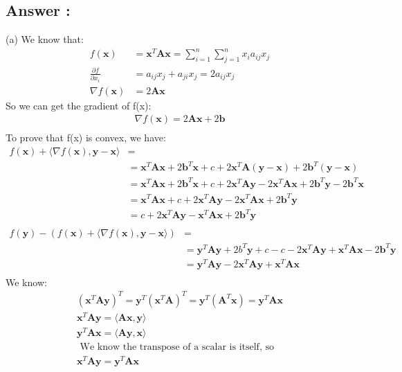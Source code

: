 \documentclass[a4paper,12pt]{article}
\begin{document}
\subsection*{Answer :}
(a) We know that:
\begin{align*}
    f(\bm{x}) &= \bm{x}^T\bm{A}\bm{x} = \sum_{i=1}^n \sum_{j = 1}^n x_i a_{ij} x_j \\
    \frac {\partial f}{\partial x_i} &= a_{ij}x_j + a_{ji}x_j = 2a_{ij}x_j \\
    \nabla f(\bm{x}) &= 2\bm{A}\bm{x}
\end{align*}
So we can get the gradient of f(x):
\begin{align*}
    \nabla f(\bm{x}) = 2\bm{A}\bm{x} + 2\bm{b} \\
\end{align*}
To prove that f(x) is convex, we have:
\begin{align*}
    f(\bm{x}) + \langle \nabla f(\bm{x}), \bm{y} - \bm{x}\rangle &=  \\
    &= \bm{x}^T\bm{A}\bm{x} + 2\bm{b}^T\bm{x} + c + 2\bm{x}^T\bm{A}(\bm{y} - \bm{x}) + 2\bm{b}^T(\bm{y} - \bm{x}) \\
    &= \bm{x}^T\bm{A}\bm{x} + 2\bm{b}^T\bm{x} + c + 2\bm{x}^T\bm{A}\bm{y} - 2\bm{x}^T\bm{A}\bm{x} + 2\bm{b}^T\bm{y} - 2\bm{b}^T\bm{x} \\
    &= \bm{x}^T\bm{A}\bm{x} + c + 2\bm{x}^T\bm{A}\bm{y} - 2\bm{x}^T\bm{A}\bm{x} + 2\bm{b}^T\bm{y} \\
    &= c + 2\bm{x}^T\bm{A}\bm{y} - \bm{x}^T\bm{A}\bm{x} + 2\bm{b}^T\bm{y} \\
\end{align*}
\begin{align*}
    f(\bm{y}) - (f(\bm{x} )+ \langle \nabla f(\bm{x}), \bm{y} - \bm{x}\rangle) &=  \\
    &= \bm{y}^T\bm{A}\bm{y} + 2b^T\bm{y} + c - c - 2\bm{x}^T\bm{A}\bm{y} + \bm{x}^T\bm{A}\bm{x} - 2\bm{b}^T\bm{y} \\
    &= \bm{y}^T\bm{A}\bm{y} - 2\bm{x}^T\bm{A}\bm{y} + \bm{x}^T\bm{A}\bm{x}  \\
\end{align*}
We know:
\begin{align*}
    (\bm{x}^T\bm{A}\bm{y})^T = \bm{y}^T(\bm{x}^T\bm{A})^T = \bm{y}^T(\bm{A}^T\bm{x}) = \bm{y}^T\bm{A}\bm{x} \\
    \bm{x}^T\bm{A}\bm{y} = \langle \bm{A}\bm{x}, \bm{y}\rangle \\
    \bm{y}^T\bm{A}\bm{x} = \langle \bm{A}\bm{y}, \bm{x}\rangle \\
    \text{ We know the transpose of a scalar is itself, so} \\
    \bm{x}^T\bm{A}\bm{y} = \bm{y}^T\bm{A}\bm{x}
\end{align*}
\end{document}
